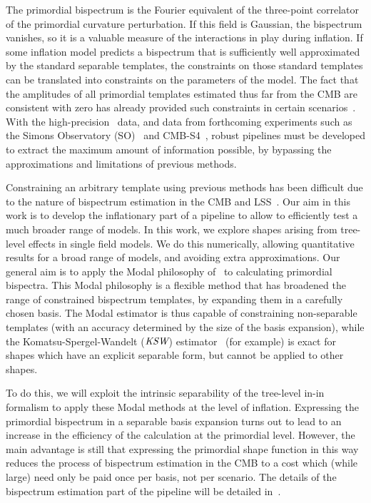 The primordial bispectrum is the Fourier equivalent of the
three-point correlator of the primordial curvature perturbation.
If this field is Gaussian, the bispectrum vanishes, so
it is a valuable measure of the interactions in play during inflation.
If some inflation model predicts a bispectrum that is sufficiently well approximated by
the standard separable templates, the constraints on those standard templates
can be translated into constraints on the parameters of the model.
The fact that the amplitudes of all primordial templates estimated thus far from the CMB
are consistent with zero has already provided such constraints
in certain scenarios~\cite{Planck_NG_2015, Planck_NG_2018}.
With the high-precision \planck~data, and data from forthcoming experiments
such as the Simons Observatory (SO)~\cite{simons}
and CMB-S4~\cite{abazajian2016cmbs4}, robust pipelines must be developed to
extract the maximum amount of information possible,
by bypassing the approximations and
limitations of previous methods.


Constraining an arbitrary template using previous methods has been difficult
due to the nature of bispectrum estimation in the CMB and
LSS~\cite{lss_baldauf,lss_karagiannis,chen_future_lss,Scoccimarro_2012}.
Our aim in this work is to develop the inflationary part
of a pipeline to allow to efficiently test a much broader range of models.
In this work, we explore shapes arising from tree-level effects in single field models.
We do this numerically, allowing quantitative results for a broad
range of models, and avoiding extra approximations.
Our general aim is to apply the Modal philosophy of~\cite{FergShell_1,FergShell_2,FergShell_3}
to calculating primordial bispectra.
This Modal philosophy is a flexible method that has broadened the range of constrained
bispectrum templates, by expanding them in a carefully chosen basis.
The Modal estimator is thus capable of constraining
non-separable templates (with an accuracy determined by the size of the basis expansion),
while the Komatsu-Spergel-Wandelt (${\textit{\text{KSW}}}$) estimator~\cite{Komatsu_2005}
(for example) is exact for shapes which have an explicit separable form,
but cannot be applied to other shapes.


To do this, we will exploit the intrinsic separability of the
tree-level in-in formalism to apply these Modal methods at the level of inflation.
Expressing the primordial bispectrum in a separable
basis expansion turns out to lead to an increase in the efficiency
of the calculation at the primordial level.
However, the main advantage is still that
expressing the primordial shape function
in this way reduces the process of bispectrum estimation in the CMB to a
cost which (while large) need only be paid once per basis,
not per scenario.
The details of the bispectrum estimation part of
the pipeline will be detailed in~\cite{Sohn_2021}.


